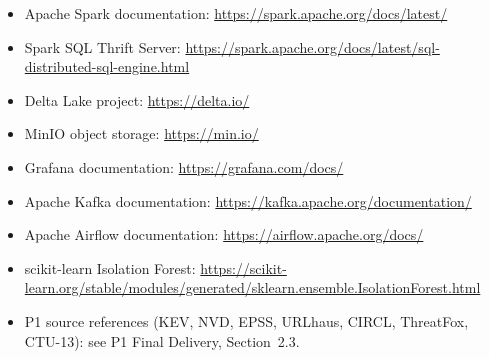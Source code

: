 \documentclass[11pt,a4paper]{article}
\begin{document}
{\small
\begin{itemize}
  \item Apache Spark documentation: \url{https://spark.apache.org/docs/latest/}
  \item Spark SQL Thrift Server: \url{https://spark.apache.org/docs/latest/sql-distributed-sql-engine.html}
  \item Delta Lake project: \url{https://delta.io/}
  \item MinIO object storage: \url{https://min.io/}
  \item Grafana documentation: \url{https://grafana.com/docs/}
  \item Apache Kafka documentation: \url{https://kafka.apache.org/documentation/}
  \item Apache Airflow documentation: \url{https://airflow.apache.org/docs/}
  \item scikit-learn Isolation Forest: \url{https://scikit-learn.org/stable/modules/generated/sklearn.ensemble.IsolationForest.html}
  \item P1 source references (KEV, NVD, EPSS, URLhaus, CIRCL, ThreatFox, CTU-13): see P1 Final Delivery, Section~2.3.
\end{itemize}
}
\end{document}
